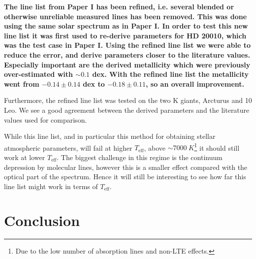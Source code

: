 \documentclass{aa}
\begin{document}
{\bf The line list from Paper I has been refined, i.e. several blended or
otherwise unreliable measured lines has been removed. This was done using the
same solar spectrum as in Paper I. In order to test this new line list it was
first used to re-derive parameters for HD 20010, which was the test case in
Paper I. Using the refined line list we were able to reduce the error, and
derive parameters closer to the literature values. Especially important are the
derived metallicity which were previously over-estimated with $\sim0.1$ dex.
With the refined line list the metallicity went from $-0.14\pm0.14$ dex to
$-0.18\pm0.11$, so an overall improvement.

Furthermore, the refined line list was tested on the two K giants, Arcturus and
10 Leo. We see a good agreement between the derived parameters and the
literature values used for comparison.

While this line list, and in particular this method for obtaining stellar
atmospheric parameters, will fail at higher $T_\mathrm{eff}$, above
$\sim\SI{7000}{K}$\footnote{Due to the low number of absorption lines and
non-LTE effects.} it should still work at lower $T_\mathrm{eff}$. The biggest
challenge in this regime is the continuum depression by molecular lines, however
this is a smaller effect compared with the optical part of the spectrum. Hence
it will still be interesting to see how far this line list might work in terms
of $T_\mathrm{eff}$.}



\section{Conclusion}
\label{sec:conclusion}
\end{document}

